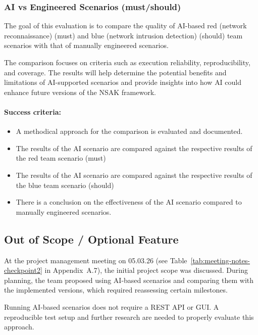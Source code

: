 \subsubsection{\gls{AI} vs Engineered Scenarios (must/should)}\label{subsubsec:ai-vs-engineered-scenarios}

The goal of this evaluation is to compare the quality of \gls{AI}-based red (network reconnaissance) (must) and blue (network intrusion detection) (should) team scenarios with that of manually engineered scenarios.

The comparison focuses on criteria such as execution reliability, reproducibility, and coverage.
The results will help determine the potential benefits and limitations of \gls{AI}-supported scenarios and provide insights into how \gls{AI} could enhance future versions of the \gls{NSAK} framework.

\paragraph{Success criteria:}

\begin{itemize}
	\item A methodical approach for the comparison is evaluated and documented.
	\item The results of the \gls{AI} scenario are compared against the respective results of the red team scenario (must)
	\item The results of the \gls{AI} scenario are compared against the respective results of the blue team scenario (should)
	\item There is a conclusion on the effectiveness of the \gls{AI} scenario compared to manually engineered scenarios.
\end{itemize}

\subsection{Out of Scope / Optional Feature}\label{subsec:out-of-scope-optional-feature}

At the project management meeting on 05.03.26 (see Table~\ref{tab:meeting-notes-checkpoint2} in Appendix~A.7), the initial project scope was discussed.
During planning, the team proposed using \gls{AI}-based scenarios and comparing them with the implemented versions, which required reassessing certain milestones.

Running \gls{AI}-based scenarios does not require a REST \gls{API} or \gls{GUI}.
A reproducible test setup and further research are needed to properly evaluate this approach.
